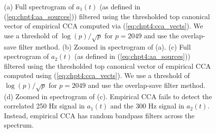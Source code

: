 \begin{figure}
\begin{center}
{    }   
    \caption{(a) Full spectrogram of $a_1(t)$ (as defined in (\ref{eq:chpt4:aa_sources}))
      filtered using the thresholded top canonical vector of empirical CCA computed via
      (\ref{eq:chpt4:cca_vects}). We use a threshold of $\log(p)/\sqrt{p}$ for $p=2049$
      and use the overlap-save filter method. (b) Zoomed in spectrogram of (a). (c) Full
      spectrogram of $a_2(t)$ (as defined in (\ref{eq:chpt4:aa_sources})) filtered using
      the thresholded top canonical vector of empirical CCA computed using
      (\ref{eq:chpt4:cca_vects}). We use a threshold of $\log(p)/\sqrt{p}$ for $p=2049$
      and use the overlap-save filter method. (d) Zoomed in spectrogram of (c). Empirical
      CCA fails to detect the correlated 250 Hz signal in $a_1(t)$ and the 300 Hz signal
      in $a_2(t)$. Instead, empirical CCA has random bandpass filters across the
      spectrum.}
    \label{fig:chpt4:aa_cca_spectrograms}
  \end{center}
\end{figure}

